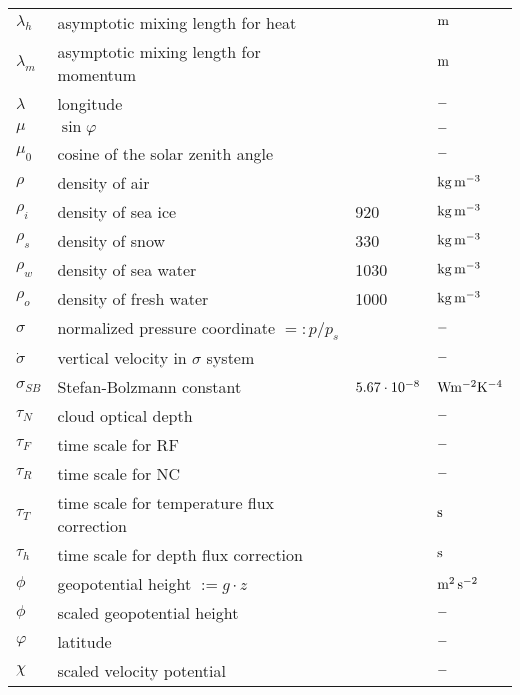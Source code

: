 \begin{tabular*}{\textwidth}{l@{\extracolsep\fill}lll}
$\lambda_h$    & asymptotic mixing length for heat     &    &$\rm m $\\
$\lambda_m$    & asymptotic mixing length for momentum      &    &$\rm m $\\

$\lambda$      & longitude                                  &         & $\rm -$ \\

$\mu$          & $\sin\varphi$                              &         & $\rm -$ \\
$\mu_0$   & cosine of the solar zenith angle           &         & $\rm -$ \\ 

$\rho$         & density of air                   &         & $\rm kg\,
m^{-3}$ \\
$\rho_i$  & density of sea ice                    & 920          & $\rm kg\, m^{-3}$
\\
$\rho_s$  & density of snow                       & 330          & $\rm kg\, m^{-3}$
\\
$\rho_w$  & density of sea water                  & 1030         & $\rm kg\,
m^{-3}$ \\
$\rho_o$  & density of fresh water                & 1000    & $\rm kg\, m^{-3}$
\\

$\sigma$  & normalized pressure coordinate $=: p/p_s$       &         & $\rm -$ \\
$\dot{\sigma}$  & vertical velocity in $\sigma$ system           &         & $\rm -$ \\
$\sigma_{SB}$ & Stefan-Bolzmann constant & $ 5.67 \cdot 10^{-8}$ &$\rm W m^{-2}K^{-4}$ \\
$\tau_N$  & cloud optical depth    &    &$\rm  -$\\
$\tau_{F}$     & time scale for RF                     &         & $\rm -$ \\
$\tau_{R}$     & time scale for NC                     &         & $\rm -$ \\
$\tau_{T}$     & time scale for temperature flux correction      &         & $\rm s$ \\
$\tau_{h}$     & time scale for depth flux correction            &         & $\rm s$ \\

$\phi$         & geopotential height $:=g\cdot{z}$          &         & $\rm m^2\,
s^{-2}$ \\
$\phi$         & scaled geopotential height            &         & $\rm -$ \\
$\varphi$      & latitude                                   &         & $\rm -$ \\

$\chi$    & scaled velocity potential                  &         & $\rm -$ \\
\end{tabular*}

